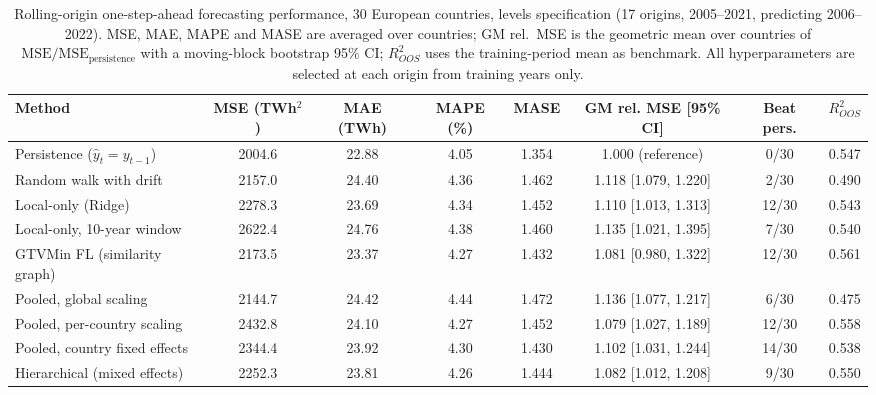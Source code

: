 \begin{table}[htbp]
\centering
\caption{Rolling-origin one-step-ahead forecasting performance, 30 European countries, levels specification (17 origins, 2005--2021, predicting 2006--2022). MSE, MAE, MAPE and MASE are averaged over countries; GM rel.\ MSE is the geometric mean over countries of $\mathrm{MSE}/\mathrm{MSE}_{\text{persistence}}$ with a moving-block bootstrap 95\% CI; $R^2_{OOS}$ uses the training-period mean as benchmark. All hyperparameters are selected at each origin from training years only.}
\label{tab:table_main}
\begin{tabular}{lccccccc}
\toprule
Method & MSE (TWh$^2$) & MAE (TWh) & MAPE (\%) & MASE & GM rel. MSE [95\% CI] & Beat pers. & $R^2_{OOS}$ \\
\midrule
Persistence ($\hat y_t = y_{t-1}$) & 2004.6 & 22.88 & 4.05 & 1.354 & 1.000 (reference) & 0/30 & 0.547 \\
Random walk with drift & 2157.0 & 24.40 & 4.36 & 1.462 & 1.118 [1.079, 1.220] & 2/30 & 0.490 \\
Local-only (Ridge) & 2278.3 & 23.69 & 4.34 & 1.452 & 1.110 [1.013, 1.313] & 12/30 & 0.543 \\
Local-only, 10-year window & 2622.4 & 24.76 & 4.38 & 1.460 & 1.135 [1.021, 1.395] & 7/30 & 0.540 \\
GTVMin FL (similarity graph) & 2173.5 & 23.37 & 4.27 & 1.432 & 1.081 [0.980, 1.322] & 12/30 & 0.561 \\
Pooled, global scaling & 2144.7 & 24.42 & 4.44 & 1.472 & 1.136 [1.077, 1.217] & 6/30 & 0.475 \\
Pooled, per-country scaling & 2432.8 & 24.10 & 4.27 & 1.452 & 1.079 [1.027, 1.189] & 12/30 & 0.558 \\
Pooled, country fixed effects & 2344.4 & 23.92 & 4.30 & 1.430 & 1.102 [1.031, 1.244] & 14/30 & 0.538 \\
Hierarchical (mixed effects) & 2252.3 & 23.81 & 4.26 & 1.444 & 1.082 [1.012, 1.208] & 9/30 & 0.550 \\
\bottomrule
\end{tabular}
\end{table}
